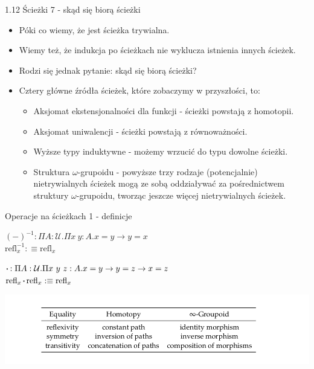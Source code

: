 \documentclass{beamer}
\newcommand{\U}{\mathcal{U}}
\newcommand{\refl}[1]{\text{refl}_{#1}}
\newcommand*\sq{\mathbin{\vcenter{\hbox{\rule{.3ex}{.3ex}}}}}
\begin{document}
\begin{frame}{1.12 Ścieżki 7 - skąd się biorą ścieżki}
\begin{itemize}
	\item Póki co wiemy, że jest ścieżka trywialna.
	\item Wiemy też, że indukcja po ścieżkach nie wyklucza istnienia innych ścieżek.
	\item Rodzi się jednak pytanie: skąd się biorą ścieżki?
	\item Cztery główne źródła ścieżek, które zobaczymy w przyszłości, to:
	\begin{itemize}
		\item Aksjomat ekstensjonalności dla funkcji - ścieżki powstają z homotopii.
		\item Aksjomat uniwalencji - ścieżki powstają z równoważności.
		\item Wyższe typy induktywne - możemy wrzucić do typu dowolne ścieżki.
		\item Struktura $\omega$-grupoidu - powyższe trzy rodzaje (potencjalnie) nietrywialnych ścieżek mogą ze sobą oddziaływać za pośrednictwem struktury $\omega$-grupoidu, tworząc jeszcze więcej nietrywialnych ścieżek. 
	\end{itemize}
\end{itemize}
\end{frame}

\begin{frame}{Operacje na ścieżkach 1 - definicje}

\begin{definition}
$(-)^{-1} : \Pi A : \U. \Pi x\ y : A. x = y \to y = x$ \\
$\refl{x}^{-1} :\equiv \refl{x}$
\end{definition}

\begin{definition}
$\sq : \Pi A : \U. \Pi x\ y\ z : A. x = y \to y = z \to x = z$ \\
$\refl{x} \sq \refl{x} :\equiv \refl{x}$
\end{definition}

\includegraphics[scale=0.3]{EqPathGrupoid.png}

\end{frame}
\end{document}
